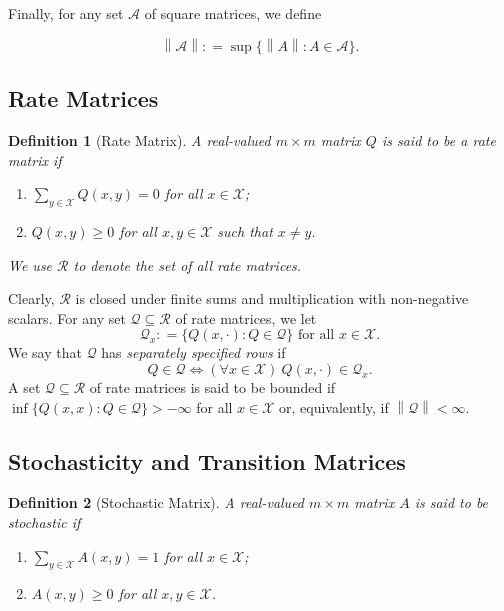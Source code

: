 \documentclass[10pt]{paper}
\newtheorem{definition}{Definition}
\newcommand{\states}{\mathcal{X}}
\newcommand{\rateset}{\mathcal{Q}}
\newcommand{\asa}{\Leftrightarrow}
\newcommand{\norm}[1]{\left\lVert #1 \right\rVert}
\newcommand{\coloneqq}{:\!=}
\begin{document}
\noindent
Finally, for any set $\mathcal{A}$ of square matrices, we define

\begin{equation*}
\norm{\mathcal{A}}\coloneqq\sup\{\norm{A}\colon A\in\mathcal{A}\}.
\end{equation*}

\subsection{Rate Matrices}

\begin{definition}[Rate Matrix]\label{def:rate_matrix}
A real-valued $m\times m$ matrix $Q$ is said to be a \emph{rate matrix} if

\vspace{5pt}
\begin{enumerate}[label=R\arabic*:]
\item
$\sum_{y\in\states}Q(x,y)=0$ for all $x\in\states$;
\item
$Q(x,y)\geq0$ for all $x,y\in\states$ such that $x\neq y$.
\end{enumerate}
\vspace{5pt}
\noindent
We use $\mathcal{R}$ to denote the set of all rate matrices. 
\end{definition}

Clearly, $\mathcal{R}$ is closed under finite sums and multiplication with non-negative scalars. For any set $\rateset\subseteq\mathcal{R}$ of rate matrices, we let
\begin{equation*}
\rateset_x\coloneqq\{Q(x,\cdot)\colon Q\in\rateset\}
\text{ for all $x\in\states$.}
\end{equation*}
We say that $\rateset$ has \emph{separately specified rows} if
\begin{equation*}
Q\in\rateset\asa(\forall x\in\states)~Q(x,\cdot)\in\rateset_x.
\end{equation*}
A set $\rateset\subseteq\mathcal{R}$ of rate matrices is said to be bounded if $\inf\{Q(x,x)\colon Q\in\rateset\}>-\infty$ for all $x\in\states$ or, equivalently, if $\norm{\rateset}<\infty$. 

\subsection{Stochasticity and Transition Matrices}

\begin{definition}[Stochastic Matrix]\label{def:stoch_matrix}
A real-valued $m\times m$ matrix $A$ is said to be \emph{stochastic} if
\vspace{5pt}
\begin{enumerate}[label=S\arabic*:]
\item
$\sum_{y\in\states}A(x,y)=1$ for all $x\in\states$;
\item
$A(x,y)\geq0$ for all $x,y\in\states$.
\end{enumerate}
\vspace{5pt}
\noindent
\end{definition}
\end{document}
